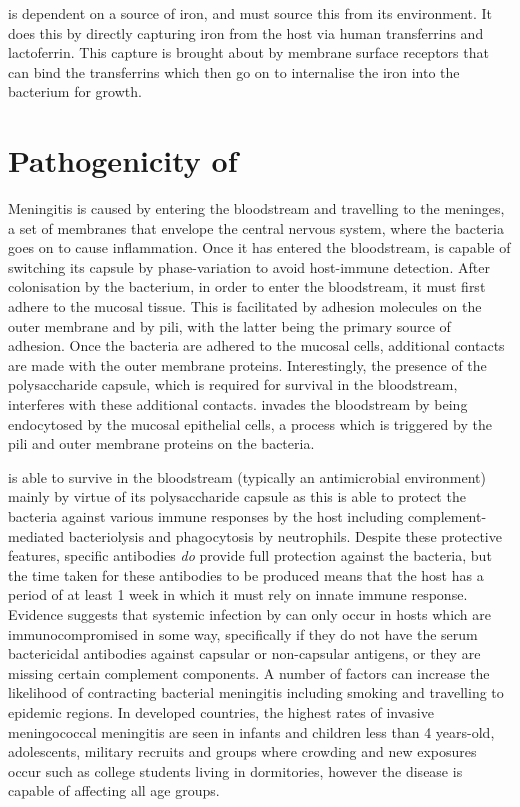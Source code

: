 \Nm{} is dependent on a source of iron, and must source this from its environment\cite{Larson2002}. It does this by directly capturing iron from the host via human transferrins\cite{Archibald1978,Perkins-Balding2004,Larson2002} and lactoferrin\cite{Larson2002}. This capture is brought about by membrane surface receptors that can bind the transferrins which then go on to internalise the iron into the bacterium for growth\cite{Yazdankhah2004}.

\section{Pathogenicity of \Nm{}}
Meningitis is caused by \Nm{} entering the bloodstream and travelling to the meninges, a set of membranes that envelope the central nervous system, where the bacteria goes on to cause inflammation. Once it has entered the bloodstream, \Nm{} is capable of switching its capsule by phase-variation to avoid host-immune detection\cite{Beddek2009,Moxon1994}. After colonisation by the bacterium, in order to enter the bloodstream, it must first adhere to the mucosal tissue. This is facilitated by adhesion molecules on the outer membrane and by pili, with the latter being the primary source of adhesion\cite{Deuren2000,Carbonnelle2009}. Once the bacteria are adhered to the mucosal cells, additional contacts are made with the outer membrane proteins. Interestingly, the presence of the polysaccharide capsule, which is required for survival in the bloodstream, interferes with these additional contacts\cite{Stephens2009}. \Nm{} invades the bloodstream by being endocytosed by the mucosal epithelial cells, a process which is triggered by the pili and outer membrane proteins on the bacteria.

\Nm{} is able to survive in the bloodstream (typically an antimicrobial environment) mainly by virtue of its polysaccharide capsule as this is able to protect the bacteria against various immune responses by the host including complement-mediated bacteriolysis and phagocytosis by neutrophils\cite{Deuren2000}. Despite these protective features, specific antibodies \textit{do} provide full protection against the bacteria, but the time taken for these antibodies to be produced means that the host has a period of at least 1 week in which it must rely on innate immune response\cite{Deuren2000}. Evidence suggests that systemic infection by \Nm{} can only occur in hosts which are immunocompromised in some way, specifically if they do not have the serum bactericidal antibodies against capsular or non-capsular antigens, or they are missing certain complement components\cite{DeVoe1982}. A number of factors can increase the likelihood of contracting bacterial meningitis including smoking and travelling to epidemic regions\cite{Stephens2009}. In developed countries, the highest rates of invasive meningococcal meningitis are seen in infants and children less than 4 years-old, adolescents, military recruits and groups where crowding and new exposures occur such as college students living in dormitories, however the disease is capable of affecting all age groups\cite{Stephens2009}.

